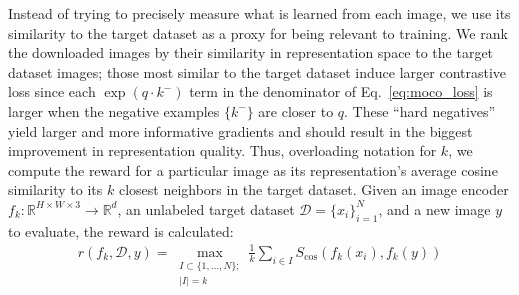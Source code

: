 Instead of trying to precisely measure what is learned from each image, we use its similarity to the target dataset as a proxy for being relevant to training.
We rank the downloaded images by their similarity in representation space to the target dataset images; those most similar to the target dataset induce larger contrastive loss since each $\exp(q \cdot k^-)$ term in the denominator of Eq.~\ref{eq:moco_loss} is larger when the negative examples $\{k^-\}$ are closer to $q$.
These ``hard negatives''~\cite{robinson2020contrastive,schroff2015facenet,oh2016deep,harwood2017smart,wu2017sampling,ge2018deep} yield larger and more informative gradients and should result in the biggest improvement in representation quality.
Thus, overloading notation for $k$, we compute the reward for a particular image as its representation's average cosine similarity to its $k$ closest neighbors in the target dataset. Given an image encoder $f_k: \mathbb{R}^{H\times W\times 3} \rightarrow \mathbb{R}^d$, an unlabeled target dataset $\mathcal D = \{ x_i \}_{i=1}^N$, and a new image $y$ to evaluate, the reward is calculated:
\begin{align}
    r(f_k, \mathcal D, y) =
        \max_{\substack{I \subset \{1, \ldots, N\}; \\ |I| = k}}
        \frac{1}{k} \sum_{i \in I} S_{\cos}\left(f_k(x_i), f_k(y)\right)
\end{align}
